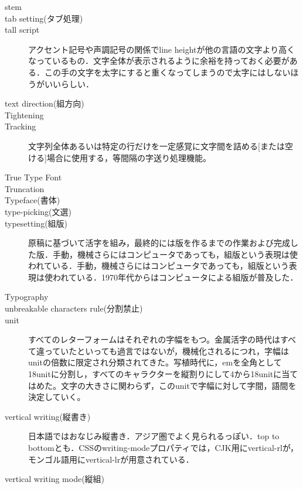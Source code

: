 \begin{description}
    \item[stem]
    \item[tab setting(タブ処理)]
    \item[tall script]アクセント記号や声調記号の関係でline heightが他の言語の文字より高くなっているもの．文字全体が表示されるように余裕を持っておく必要がある\cite{developer.apple.com:videos/play/wwdc2016/201/}．この手の文字を太字にすると重くなってしまうので太字にはしないほうがいいらしい\cite{material.io:design/typography/language-support.html}．
    \item[text direction(組方向)]
    \item[Tightening]
    \item[Tracking]文字列全体あるいは特定の行だけを一定感覚に文字間を詰める[または空ける]場合に使用する，等間隔の字送り処理機能\cite{handbook_of_typography}。
    \item[True Type Font]
    \item[Truncation]
    \item[Typeface(書体)]
    \item[type-picking(文選)]
    \item[typesetting(組版)] 原稿に基づいて活字を組み，最終的には版を作るまでの作業および完成した版．手動，機械さらにはコンピュータであっても，組版という表現は使われている．手動，機械さらにはコンピュータであっても，組版という表現は使われている\cite{lis_dictionary}．1970年代からはコンピュータによる組版が普及した\cite{www.printing-museum.org:communication/column/pdf/column_6.pdf}．
    \item[Typography]
    \item[unbreakable characters rule(分割禁止)]
    \item[unit]すべてのレターフォームはそれぞれの字幅をもつ。金属活字の時代はすべて違っていたといっても過言ではないが，機械化されるにつれ，字幅はunitの倍数に限定され分類されてきた。写植時代に，emを全角として18unitに分割し，すべてのキャラクターを縦割りにして4から18unitに当てはめた。文字の大きさに関わらず，このunitで字幅に対して字間，語間を決定していく\cite{handbook_of_typography}。
    \item[vertical writing(縦書き)] 日本語ではおなじみ縦書き．アジア圏でよく見られるっぽい．top to bottomとも\cite{eikaiwa.dmm.com:uknow/questions/29852/}\cite{www.w3.org:International/questions/qa-scripts}．CSSの{\sf writing-mode}プロパティでは，CJK用に{\sf vertical-rl}が，モンゴル語用に{\sf vertical-lr}が用意されている\cite{www.w3.org:International/articles/vertical-text/}．
    \item[vertical writing mode(縦組)]

\end{description}
